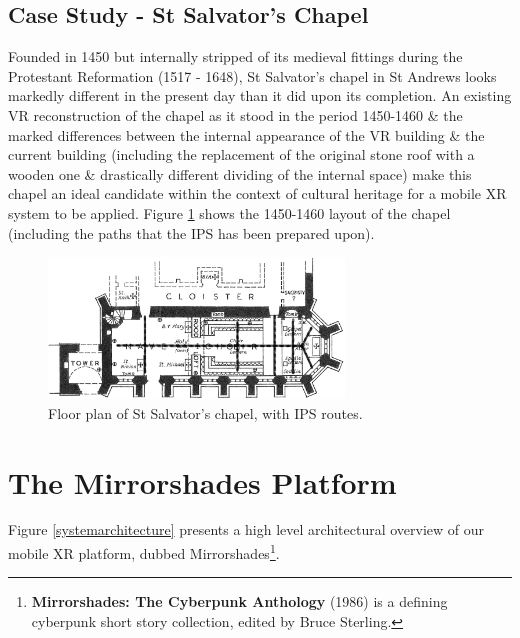 
\pagebreak

\subsection{Case Study - St Salvator's Chapel}
Founded in 1450 but internally stripped of its medieval fittings during the Protestant Reformation (1517 - 1648), St Salvator's chapel in St Andrews looks markedly different in the present day than it did upon its completion. An existing VR reconstruction of the chapel as it stood in the period 1450-1460 \& the marked differences between the internal appearance of the VR building \& the current building (including the replacement of the original stone roof with a wooden one \& drastically different dividing of the internal space) make this chapel an ideal candidate within the context of cultural heritage for a mobile XR system to be applied. Figure \ref{sallies_layout} shows the 1450-1460 layout of the chapel (including the paths that the IPS has been prepared upon).

\begin{figure}[h]
	\begin{center}
		\includegraphics[width=0.7\textwidth]{images/sallies_layout.png}
		\caption{Floor plan of St Salvator's chapel, with IPS routes.}
		\label{sallies_layout}
	\end{center}
\end{figure}

\clearpage


\section{The Mirrorshades Platform}
Figure \ref{systemarchitecture} presents a high level architectural overview of our mobile XR platform, dubbed Mirrorshades\footnote{\textbf{Mirrorshades: The Cyberpunk Anthology} (1986) is a defining cyberpunk short story collection, edited by Bruce Sterling.}.


